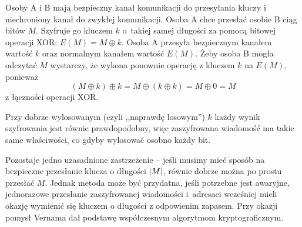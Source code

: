 Osoby A i B mają bezpieczny kanał komunikacji do przesyłania kluczy i niechroniony kanał do zwykłej komunikacji. Osoba A chce przesłać osobie B ciąg bitów \( M \).
Szyfruje go kluczem \( k \) o~takiej samej długości za pomocą bitowej operacji XOR: \( E(M) = M \oplus k \).
Osoba A przesyła bezpiecznym kanałem wartość \( k \) oraz normalnym kanałem wartość \( E(M) \). Żeby osoba B mogła odczytać \( M \) wystarczy, że wykona ponownie operację z kluczem \( k \) na \( E(M) \), ponieważ
\[
    (M \oplus k) \oplus k = M \oplus (k \oplus k)  = M \oplus 0 = M
\]
z łączności operacji XOR.

Przy dobrze wylosowanym (czyli ,,naprawdę losowym'') \( k \) każdy wynik szyfrowania jest równie prawdopodobny, więc zaszyfrowana wiadomość ma takie same właściwości, co gdyby wylosować osobno każdy bit.

Pozostaje jedno uzasadnione zastrzeżenie -- jeśli musimy mieć sposób na bezpieczne przesłanie klucza o długości \( \left\lvert M\right\rvert \), równie dobrze można po prostu przesłać \( M \).
Jednak metoda może być przydatna, jeśli potrzebne jest awaryjne, jednorazowe przesłanie zaszyfrowanej wiadomości i~adresaci wcześniej mieli okazję wymienić się kluczem o długości z odpowienim zapasem. Przy okazji pomysł Vernama dał podstawę współczesnym algorytmom kryptograficznym.